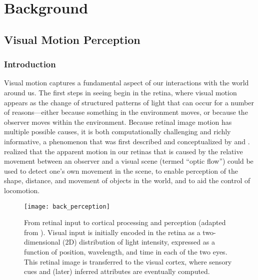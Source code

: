 \chapter{Background}
\label{ch:background}

\section{Visual Motion Perception}
\subsection{Introduction}
Visual motion captures a fundamental aspect of our interactions 
with the world around us.
The first steps in seeing begin in the retina, where visual motion appears
as the change of structured patterns of light
that can occur for a number of reasons---either because something in 
the environment moves, or because the observer moves within the environment.
Because retinal image motion has multiple possible causes, it is both
computationally challenging and richly informative,
a phenomenon that was first described and conceptualized by
\cite{Helmholtz1925} and \cite{Gibson1950}.
\cite{Gibson1950} realized that the apparent motion in our retinas that is
caused by the relative movement between an observer and a visual scene
(termed ``optic flow'') could be used to detect one's own movement
in the scene, to enable perception of the shape, distance, and movement of
objects in the world, and to aid the control of locomotion.

\begin{figure}[t]
  \centering
  \texttt{[image: back\_perception]}
  \caption{
  From retinal input to cortical processing and perception
  (adapted from \cite{NassiCallaway2009}).
  Visual input is initially encoded in the retina as a two-dimensional (2D)
  distribution of light intensity, expressed as a function of position, wavelength,
  and time in each of the two eyes.
  This retinal image is transferred to the visual cortex, where sensory cues and
  (later) inferred attributes are eventually computed.}
  \label{fig:BKG|perception}
\end{figure}

